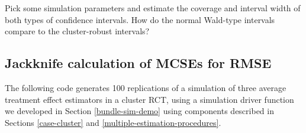 \documentclass[
]{book}
\newenvironment{Shaded}{\begin{snugshade}}{\end{snugshade}}
\newcommand{\AttributeTok}[1]{\textcolor[rgb]{0.13,0.29,0.53}{#1}}
\newcommand{\DecValTok}[1]{\textcolor[rgb]{0.00,0.00,0.81}{#1}}
\newcommand{\FunctionTok}[1]{\textcolor[rgb]{0.13,0.29,0.53}{\textbf{#1}}}
\newcommand{\NormalTok}[1]{#1}
\newcommand{\OtherTok}[1]{\textcolor[rgb]{0.56,0.35,0.01}{#1}}
\newcommand{\SpecialCharTok}[1]{\textcolor[rgb]{0.81,0.36,0.00}{\textbf{#1}}}
\newcommand{\StringTok}[1]{\textcolor[rgb]{0.31,0.60,0.02}{#1}}
\begin{document}
\begin{Shaded}
\end{Shaded}

Pick some simulation parameters and estimate the coverage and interval width of both types of confidence intervals.
How do the normal Wald-type intervals compare to the cluster-robust intervals?

\subsection{Jackknife calculation of MCSEs for RMSE}\label{jackknife-MCSE}

The following code generates 100 replications of a simulation of three average treatment effect estimators in a cluster RCT, using a simulation driver function we developed in Section \ref{bundle-sim-demo} using components described in Sections \ref{case-cluster} and \ref{multiple-estimation-procedures}.
\end{document}

